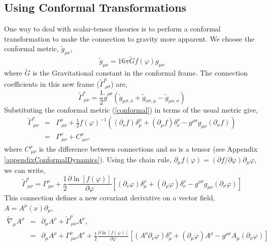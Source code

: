 \subsection{Using Conformal Transformations}
One way to deal with scalar-tensor theories is to perform a conformal transformation to make the connection to gravity more apparent. We choose the conformal metric, $\tilde{g}_{\mu\nu}$, 
\begin{equation}\label{conformal}
    \tilde{g}_{\mu\nu} = 16\pi\tilde{G}f(\varphi)g_{\mu\nu}
\end{equation}
where $\tilde{G}$ is the Gravitational constant in the conformal frame. The connection coefficients in this new frame ($\tilde{\Gamma}^{\mu}_{\ \rho\sigma}$) are, 
\begin{equation}
    \tilde{\Gamma}^{\rho}_{\ \mu\nu} = \frac{1}{2}\tilde{g}^{\rho\sigma}\left(\tilde{g}_{\mu\sigma, \nu} + \tilde{g}_{\nu\sigma, \mu} - \tilde{g}_{\mu\nu, \sigma}  \right)
\end{equation}
Substituting the conformal metric (\ref{conformal}) in terms of the usual metric give, 
\begin{eqnarray}
    \tilde{\Gamma}^{\rho}_{\ \mu\nu} &=& \Gamma^{\rho}_{\ \mu\nu} + \frac{1}{2}f(\varphi)^{-1}\left((\partial_{\nu}f)\delta^{\rho}_{\mu} + (\partial_{\mu}f)\delta^{\rho}_{\nu} -g^{\rho\sigma}g_{\mu\nu}(\partial_{\sigma}f)\right)\\
    &=& \Gamma^{\rho}_{\ \mu\nu} + C^{\rho}_{\ \mu \nu},
\end{eqnarray}
where $C^{\rho}_{\ \mu \nu}$ is the difference between connections and so is a tensor (see Appendix \ref{appendixConformalDynamics}). Using the chain rule, $\partial_{\mu}f(\varphi) = (\partial f/\partial \varphi)\partial_{\mu}\varphi$, we can write, 
\begin{equation}
    \tilde{\Gamma}^{\rho}_{\ \mu\nu} = \Gamma^{\rho}_{\ \mu\nu} + \frac{1}{2}\frac{\partial \ln[f(\varphi)]}{\partial \varphi}\left[(\partial_{\nu}\varphi)\delta^{\rho}_{\mu} + (\partial_{\mu}\varphi)\delta^{\rho}_{\nu} -g^{\rho\sigma}g_{\mu\nu}(\partial_{\sigma}\varphi)\right]
\end{equation}
This connection defines a new covariant derivative on a vector field, $A = A^{\mu}(x)\partial_{\mu}$, 
\begin{eqnarray*}
\tilde{\nabla}_{\mu}A^{\rho} &=& \partial_{\mu}A^{\rho} + \tilde{\Gamma}^{\rho}_{\ \mu\nu}A^{\nu},\\
&=& \partial_{\mu}A^{\rho} + \Gamma^{\rho}_{\ \mu\nu}A^{\nu} + \frac{1}{2}\frac{\partial \ln[f(\varphi)]}{\partial \varphi}\left[(A^{\nu}\partial_{\nu}\varphi)\delta^{\rho}_{\mu} + (\partial_{\mu}\varphi)A^{\rho} -g^{\rho\sigma}A_{\mu}(\partial_{\sigma}\varphi)\right]
\end{eqnarray*}
